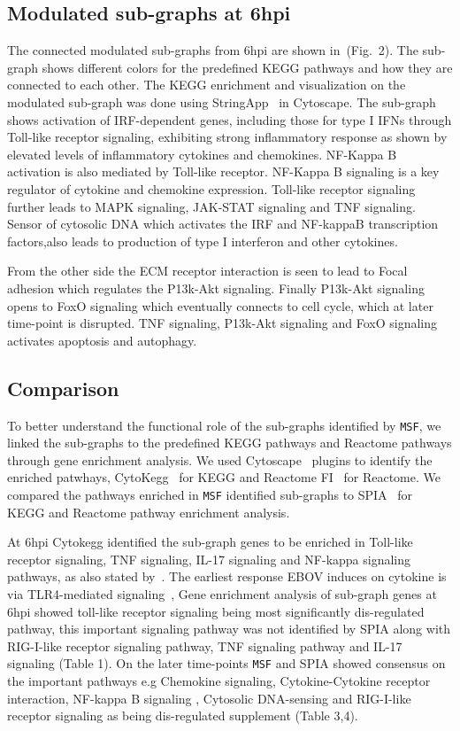 \documentclass[twocolumn]{article}
\begin{document}
\subsection*{Modulated sub-graphs at 6hpi}

 The connected modulated sub-graphs from 6hpi are shown in~(Fig.~2). The sub-graph shows different colors for the predefined KEGG pathways and how they are connected to each other. The KEGG enrichment and visualization on the modulated sub-graph was done using StringApp~\cite{StringApp} in Cytoscape. The sub-graph shows activation of IRF-dependent genes, including those for type I IFNs through Toll-like receptor signaling, exhibiting strong inflammatory response as shown by elevated levels of inflammatory cytokines and chemokines. NF-Kappa B activation is also mediated by Toll-like receptor. NF-Kappa B signaling is a key regulator of cytokine and chemokine expression. Toll-like receptor signaling further leads to  MAPK signaling, JAK-STAT signaling and TNF signaling. Sensor of cytosolic DNA which activates the IRF and NF-{kappa}B transcription factors,also leads to production of type I interferon and other cytokines. 
 
 From the other side the ECM receptor interaction is seen to lead to Focal adhesion which regulates the P13k-Akt signaling. Finally P13k-Akt signaling opens to FoxO signaling which eventually connects to cell cycle, which at later time-point is disrupted. TNF signaling, P13k-Akt signaling and FoxO signaling activates apoptosis and autophagy.

 

\subsection*{Comparison} 

To better understand the functional role of the sub-graphs identified by \texttt{MSF}, we linked the  sub-graphs to the predefined KEGG pathways and Reactome
pathways through gene enrichment analysis. We used Cytoscape~\cite{Cyto} plugins to identify the enriched patwhays, CytoKegg~\cite{Cytokegg} for KEGG and Reactome FI~\cite{Reactome} for Reactome. We compared the pathways enriched in \texttt{MSF} identified sub-graphs to SPIA~\cite{Tarca} for KEGG and Reactome pathway enrichment analysis. 

At 6hpi Cytokegg identified the sub-graph genes to be enriched in Toll-like receptor signaling, TNF signaling, IL-17 signaling and NF-kappa signaling pathways, as also stated by~\cite{Olejnik}. The earliest response EBOV induces on  cytokine is via TLR4-mediated signaling~\cite{Olejnik}, Gene enrichment analysis of sub-graph genes at 6hpi showed toll-like receptor signaling being most significantly dis-regulated pathway, this important signaling pathway was not identified by SPIA along with RIG-I-like receptor signaling pathway, TNF signaling pathway and IL-17 signaling (Table 1). 
On the later time-points \texttt{MSF} and SPIA showed consensus on the important pathways e.g Chemokine signaling, Cytokine-Cytokine receptor interaction, NF-kappa B signaling , Cytosolic DNA-sensing and RIG-I-like receptor signaling as being dis-regulated supplement (Table 3,4). 
\end{document}
